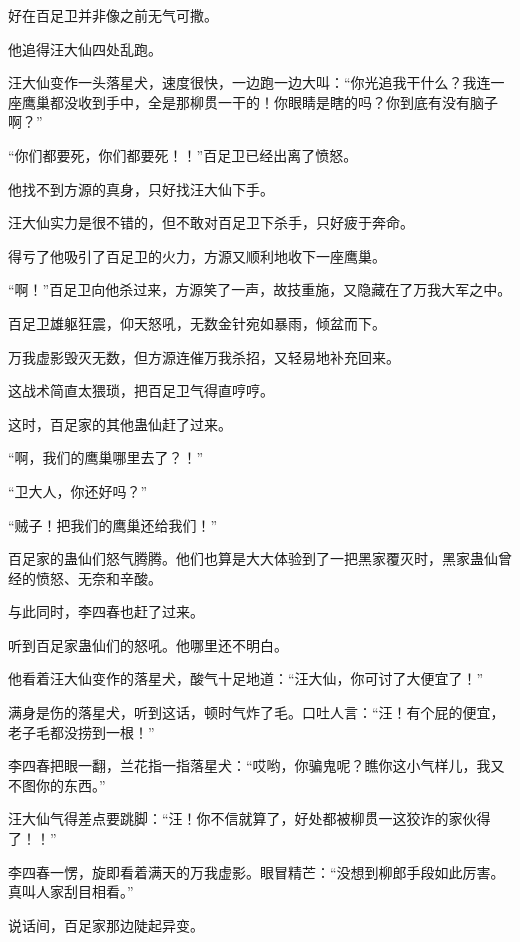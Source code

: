 
\begin{this_body}



好在百足卫并非像之前无气可撒。

他追得汪大仙四处乱跑。

汪大仙变作一头落星犬，速度很快，一边跑一边大叫：“你光追我干什么？我连一座鹰巢都没收到手中，全是那柳贯一干的！你眼睛是瞎的吗？你到底有没有脑子啊？”

“你们都要死，你们都要死！！”百足卫已经出离了愤怒。

他找不到方源的真身，只好找汪大仙下手。

汪大仙实力是很不错的，但不敢对百足卫下杀手，只好疲于奔命。

得亏了他吸引了百足卫的火力，方源又顺利地收下一座鹰巢。

“啊！”百足卫向他杀过来，方源笑了一声，故技重施，又隐藏在了万我大军之中。

百足卫雄躯狂震，仰天怒吼，无数金针宛如暴雨，倾盆而下。

万我虚影毁灭无数，但方源连催万我杀招，又轻易地补充回来。

这战术简直太猥琐，把百足卫气得直哼哼。

这时，百足家的其他蛊仙赶了过来。

“啊，我们的鹰巢哪里去了？！”

“卫大人，你还好吗？”

“贼子！把我们的鹰巢还给我们！”

百足家的蛊仙们怒气腾腾。他们也算是大大体验到了一把黑家覆灭时，黑家蛊仙曾经的愤怒、无奈和辛酸。

与此同时，李四春也赶了过来。

听到百足家蛊仙们的怒吼。他哪里还不明白。

他看着汪大仙变作的落星犬，酸气十足地道：“汪大仙，你可讨了大便宜了！”

满身是伤的落星犬，听到这话，顿时气炸了毛。口吐人言：“汪！有个屁的便宜，老子毛都没捞到一根！”

李四春把眼一翻，兰花指一指落星犬：“哎哟，你骗鬼呢？瞧你这小气样儿，我又不图你的东西。”

汪大仙气得差点要跳脚：“汪！你不信就算了，好处都被柳贯一这狡诈的家伙得了！！”

李四春一愣，旋即看着满天的万我虚影。眼冒精芒：“没想到柳郎手段如此厉害。真叫人家刮目相看。”

说话间，百足家那边陡起异变。


\end{this_body}
